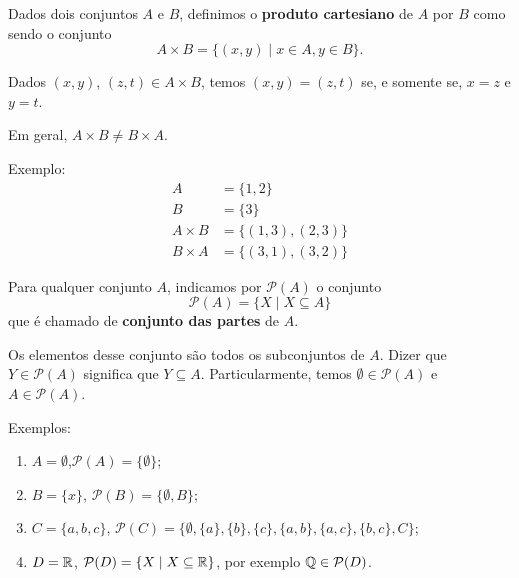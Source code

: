\begin{definicao}
	Dados dois conjuntos $A$ e $B$, definimos o \textbf{produto cartesiano} de $A$ por $B$ como sendo o conjunto
	\[
		A \times B = \{(x,y) \mid x\in A, y\in B\}.
	\]
\end{definicao}

Dados $(x,y)$, $(z,t) \in A\times B$, temos $(x,y) = (z,t)$ se, e somente se, $x = z$ e $y = t$.

Em geral, $A \times B \neq B\times A$.

Exemplo:
\begin{align*}
	A &= \{1,2\}\\
	B &= \{3\}\\
	A \times B &= \{(1,3),(2,3)\}\\
	B \times A &= \{(3,1),(3,2)\}
\end{align*}

\begin{definicao}
	Para qualquer conjunto $A$, indicamos por $\mathcal{P}(A)$ o conjunto
	\[
		\mathcal{P}(A) = \{ X \mid X\subseteq A\}
	\]
	que \'e chamado de \textbf{conjunto das partes} de $A$.
\end{definicao}

Os elementos desse conjunto s{\~a}o todos os subconjuntos de $A$. Dizer que $Y\in \mathcal{P}(A)$ significa que $Y \subseteq A$. Particularmente, temos $\emptyset\in \mathcal{P}(A)$ e $A\in \mathcal{P}(A)$.

Exemplos:
\begin{enumerate}
\item $A = \emptyset$,$\mathcal{P}(A) = \{\emptyset\}$;
\item $B = \{x\}$, $\mathcal{P}(B) = \{\emptyset, B\}$;
\item $C = \{a,b,c\}$, $\mathcal{P}(C)=\{\emptyset, \{a\}, \{b\},\{c\},\{a,b\},\{a,c\},\{b,c\},C\}$;
\item $D=\mathbb{R}$, $\mathcal{P}(D)=\{X\mid X \subseteq \mathbb{R}\}$, por exemplo $\mathbb{Q}\in \mathcal{P}(D)$.
\end{enumerate}